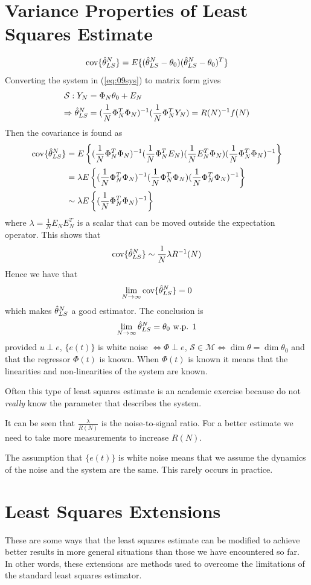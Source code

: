 \section{Variance Properties of Least Squares Estimate}
$$\text{cov}\{\hat{\theta}_{LS}^N\} = E\{(\hat{\theta}_{LS}^N-\theta_0)(\hat{\theta}_{LS}^N-\theta_0)^T\}$$
Converting the system in (\ref{eq:09sys}) to matrix form gives
\begin{align*}
\mathcal{S}: Y_N &= \Phi_N\theta_0+E_N \\
\Rightarrow \hat{\theta}_{LS}^N &= (\frac{1}{N}\Phi_N^T\Phi_N)^{-1}(\frac{1}{N}\Phi_N^TY_N) = R(N)^{-1}f(N)
\end{align*}
Then the covariance is found as
\begin{align*}
\text{cov}\{\hat{\theta}_{LS}^N\} &= E\left\lbrace(\frac{1}{N}\Phi_N^T\Phi_N)^{-1} (\frac{1}{N}\Phi_N^TE_N) (\frac{1}{N}E_N^T\Phi_N) (\frac{1}{N}\Phi_N^T\Phi_N)^{-1}\right\rbrace \\
&= \lambda E\left\lbrace(\frac{1}{N}\Phi_N^T\Phi_N)^{-1} (\frac{1}{N}\Phi_N^T\Phi_N) (\frac{1}{N}\Phi_N^T\Phi_N)^{-1}\right\rbrace \\
&\sim \lambda E\left\lbrace(\frac{1}{N}\Phi_N^T\Phi_N)^{-1}\right\rbrace
\end{align*}
where $\lambda = \frac{1}{N}E_NE_N^T$ is a scalar that can be moved outside the expectation operator. This shows that
$$\text{cov}\{\hat{\theta}_{LS}^N\} \sim \frac{1}{N}\lambda R^{-1}(N)$$
Hence we have that
$$\lim_{N\to\infty}\text{cov}\{\hat{\theta}_{LS}^N\} = 0$$
which makes $\hat{\theta}_{LS}^N$ a good estimator. The conclusion is
$$\lim_{N\to\infty}\hat{\theta}_{LS}^N = \theta_0 \text{ w.p. } 1$$
provided $u\perp e$, $\{e(t)\}$ is white noise $\Leftrightarrow \Phi\perp e$, $\mathcal{S}\in\mathcal{M} \Leftrightarrow \dim\theta = \dim\theta_0$ and that the regressor $\Phi(t)$ is known. When $\Phi(t)$ is known it means that the linearities and non-linearities of the system are known.

Often this type of least squares estimate is an academic exercise because do not \textit{really} know the parameter that describes the system.

It can be seen that $\frac{\lambda}{R(N)}$ is the noise-to-signal ratio. For a better estimate we need to take more measurements to increase $R(N)$.

The assumption that $\{e(t)\}$ is white noise means that we assume the dynamics of the noise and the system are the same. This rarely occurs in practice.

\section{Least Squares Extensions}
These are some ways that the least squares estimate can be modified to achieve better results in more general situations than those we have encountered so far. In other words, these extensions are methods used to overcome the limitations of the standard least squares estimator.


